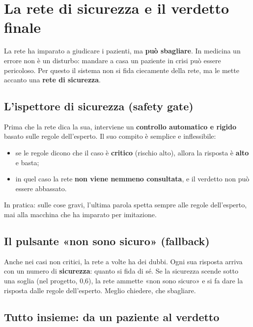 \chapter{La rete di sicurezza e il verdetto finale}\label{cap:p1-sicurezza}


La rete ha imparato a giudicare i pazienti, ma \textbf{può sbagliare}. In
medicina un errore non è un disturbo: mandare a casa un paziente in crisi
può essere pericoloso. Per questo il sistema non si fida ciecamente della rete,
ma le mette accanto una \textbf{rete di sicurezza}.

\section{L'ispettore di sicurezza (safety gate)}\label{sec:p1-sic-gate}

Prima che la rete dica la sua, interviene un \textbf{controllo automatico e
rigido} basato sulle regole dell'esperto. Il suo compito è semplice e
inflessibile:

\begin{itemize}
  \item se le regole dicono che il caso è \textbf{critico} (rischio alto),
        allora la risposta è \textbf{alto} e basta;
  \item in quel caso la rete \textbf{non viene nemmeno consultata}, e il
        verdetto non può essere abbassato.
\end{itemize}

In pratica: sulle cose gravi, l'ultima parola spetta sempre alle regole
dell'esperto, mai alla macchina che ha imparato per imitazione.

\section{Il pulsante «non sono sicuro» (fallback)}\label{sec:p1-sic-fallback}

Anche nei casi non critici, la rete a volte ha dei dubbi. Ogni sua risposta
arriva con un numero di \textbf{sicurezza}: quanto si fida di sé. Se la
sicurezza scende sotto una soglia (nel progetto, 0,6), la rete ammette
«non sono sicuro» e si fa dare la risposta dalle regole dell'esperto. Meglio
chiedere, che sbagliare.

\section{Tutto insieme: da un paziente al verdetto}\label{sec:p1-sic-flusso}


